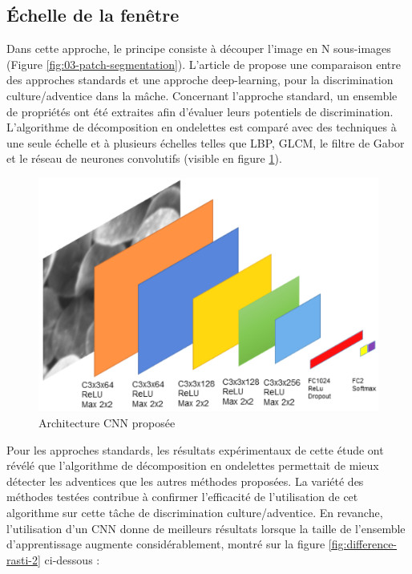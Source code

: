 \documentclass[../thesis.tex]{subfiles}
\begin{document}
    \newpage
    \subsection{Échelle de la fenêtre}
    
    Dans cette approche, le principe consiste à découper l'image en N sous-images (Figure \ref{fig:03-patch-segmentation}). L'article de \cite{rs11030249} propose une comparaison entre des approches standards et une approche deep-learning, pour la discrimination culture/adventice dans la mâche. Concernant l'approche standard, un ensemble de propriétés ont été extraites afin d'évaluer leurs potentiels de discrimination. L'algorithme de décomposition en ondelettes est comparé avec des techniques à une seule échelle et à plusieurs échelles telles que LBP, GLCM, le filtre de Gabor et le réseau de neurones convolutifs (visible en figure \ref{fig:difference-rasti}).
    
    \begin{figure}[H]
        \centering
        \includegraphics[width=0.6\linewidth]{img/biblio/difference-rasti}
        \caption{Architecture CNN proposée}
        \label{fig:difference-rasti}
    \end{figure}
    
    Pour les approches standards, les résultats expérimentaux de cette étude ont révélé que l'algorithme de décomposition en ondelettes permettait de mieux détecter les adventices que les autres méthodes proposées. La variété des méthodes testées contribue à confirmer l'efficacité de l'utilisation de cet algorithme sur cette tâche de discrimination culture/adventice. En revanche, l'utilisation d'un CNN donne de meilleurs résultats lorsque la taille de l'ensemble d'apprentissage augmente considérablement, montré sur la figure \ref{fig:difference-rasti-2} ci-dessous :
    
\end{document}

